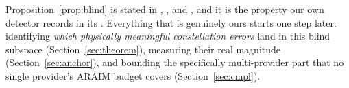 \noindent Proposition~\ref{prop:blind} is stated in \citet{sturza1988},
\citet{brown1992}, and \citet{parkinson1988}, and it is the property our own detector
records in its . Everything that is genuinely ours starts one
step later: identifying \emph{which physically meaningful constellation errors} land in
this blind subspace (Section~\ref{sec:theorem}), measuring their real magnitude
(Section~\ref{sec:anchor}), and bounding the specifically multi-provider part that no
single provider's ARAIM budget covers (Section~\ref{sec:cmpl}).
